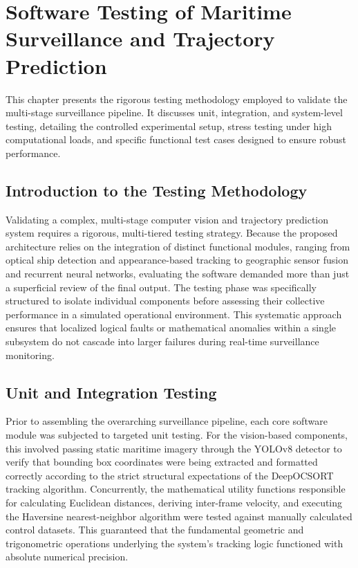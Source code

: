\chapter{Software Testing of Maritime Surveillance and Trajectory Prediction}

This chapter presents the rigorous testing methodology employed to validate the multi-stage surveillance pipeline. It discusses unit, integration, and system-level testing, detailing the controlled experimental setup, stress testing under high computational loads, and specific functional test cases designed to ensure robust performance.

\section{Introduction to the Testing Methodology}

Validating a complex, multi-stage computer vision and trajectory prediction system requires a rigorous, multi-tiered testing strategy. Because the proposed architecture relies on the integration of distinct functional modules, ranging from optical ship detection and appearance-based tracking to geographic sensor fusion and recurrent neural networks, evaluating the software demanded more than just a superficial review of the final output. The testing phase was specifically structured to isolate individual components before assessing their collective performance in a simulated operational environment. This systematic approach ensures that localized logical faults or mathematical anomalies within a single subsystem do not cascade into larger failures during real-time surveillance monitoring.

\section{Unit and Integration Testing}

Prior to assembling the overarching surveillance pipeline, each core software module was subjected to targeted unit testing. For the vision-based components, this involved passing static maritime imagery through the YOLOv8 detector to verify that bounding box coordinates were being extracted and formatted correctly according to the strict structural expectations of the DeepOCSORT tracking algorithm. Concurrently, the mathematical utility functions responsible for calculating Euclidean distances, deriving inter-frame velocity, and executing the Haversine nearest-neighbor algorithm were tested against manually calculated control datasets. This guaranteed that the fundamental geometric and trigonometric operations underlying the system's tracking logic functioned with absolute numerical precision.

